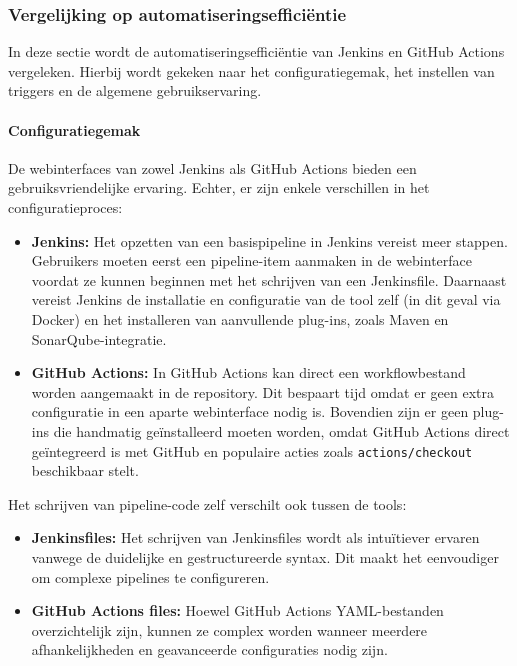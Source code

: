 \subsubsection{Vergelijking op automatiseringsefficiëntie}

In deze sectie wordt de automatiseringsefficiëntie van Jenkins en GitHub Actions vergeleken. Hierbij wordt gekeken naar het configuratiegemak, het instellen van triggers en de algemene gebruikservaring.

\paragraph{Configuratiegemak}

De webinterfaces van zowel Jenkins als GitHub Actions bieden een gebruiksvriendelijke ervaring. Echter, er zijn enkele verschillen in het configuratieproces:
\begin{itemize}
    \item \textbf{Jenkins:} Het opzetten van een basispipeline in Jenkins vereist meer stappen. Gebruikers moeten eerst een pipeline-item aanmaken in de webinterface voordat ze kunnen beginnen met het schrijven van een Jenkinsfile. Daarnaast vereist Jenkins de installatie en configuratie van de tool zelf (in dit geval via Docker) en het installeren van aanvullende plug-ins, zoals Maven en SonarQube-integratie.
    
    \item \textbf{GitHub Actions:} In GitHub Actions kan direct een workflowbestand worden aangemaakt in de repository. Dit bespaart tijd omdat er geen extra configuratie in een aparte webinterface nodig is. Bovendien zijn er geen plug-ins die handmatig geïnstalleerd moeten worden, omdat GitHub Actions direct geïntegreerd is met GitHub en populaire acties zoals \texttt{actions/checkout} beschikbaar stelt.
\end{itemize}

Het schrijven van pipeline-code zelf verschilt ook tussen de tools:
\begin{itemize}
    \item \textbf{Jenkinsfiles:} Het schrijven van Jenkinsfiles wordt als intuïtiever ervaren vanwege de duidelijke en gestructureerde syntax. Dit maakt het eenvoudiger om complexe pipelines te configureren.
    \item \textbf{GitHub Actions files:} Hoewel GitHub Actions YAML-bestanden overzichtelijk zijn, kunnen ze complex worden wanneer meerdere afhankelijkheden en geavanceerde configuraties nodig zijn.
\end{itemize}

